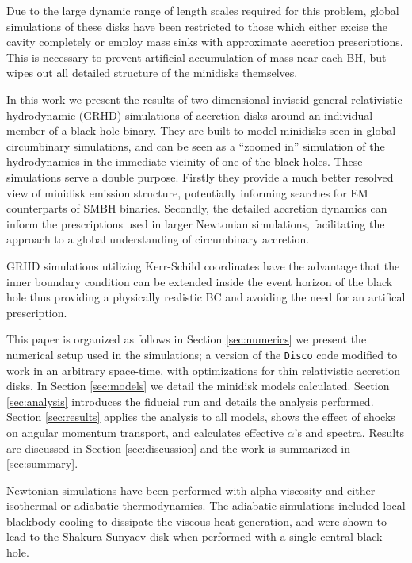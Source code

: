 \documentclass{emulateapj}
\newcommand{\Disco}{{\texttt{Disco}}}
\begin{document}
Due to the large dynamic range of length scales required for this problem, global simulations of these disks have been restricted to those which either excise the cavity completely or employ mass sinks with approximate accretion prescriptions.  This is necessary to prevent artificial accumulation of mass near each BH, but wipes out all detailed structure of the minidisks themselves.


In this work we present the results of two dimensional inviscid general relativistic hydrodynamic (GRHD) simulations of accretion disks around an individual member of a black hole binary. They are built to model minidisks seen in global circumbinary simulations, and can be seen as a ``zoomed in'' simulation of the hydrodynamics in the immediate vicinity of one of the black holes.  These simulations serve a double purpose. Firstly they provide a much better resolved view of minidisk emission structure, potentially informing searches for EM counterparts of SMBH binaries.  Secondly, the detailed accretion dynamics can inform the prescriptions used in larger Newtonian simulations, facilitating the approach to a global understanding of circumbinary accretion.


GRHD simulations utilizing Kerr-Schild coordinates have the advantage that the inner boundary condition can be extended inside the event horizon of the black hole thus providing a physically realistic BC and avoiding the need for an artifical prescription. 

This paper is organized as follows in Section \ref{sec:numerics} we present the
numerical setup used in the simulations; a version of the \Disco{} code 
modified to work in an arbitrary space-time, with optimizations for thin 
relativistic accretion disks.  In Section \ref{sec:models} we detail the 
minidisk models calculated.  Section \ref{sec:analysis} introduces the fiducial run and details the analysis performed.  Section \ref{sec:results} applies the analysis to all models, shows the effect of shocks on angular momentum transport, and calculates effective $\alpha$'s and spectra. Results are discussed in Section \ref{sec:discussion} and the work is summarized in \ref{sec:summary}.



Newtonian simulations have been performed with alpha viscosity and either isothermal \citep{Farris14} or adiabatic \citep{Farris15A, Farris15B} thermodynamics. The adiabatic simulations included local blackbody cooling to dissipate the viscous heat generation, and were shown to lead to the Shakura-Sunyaev disk when performed with a single central black hole.
\end{document}
